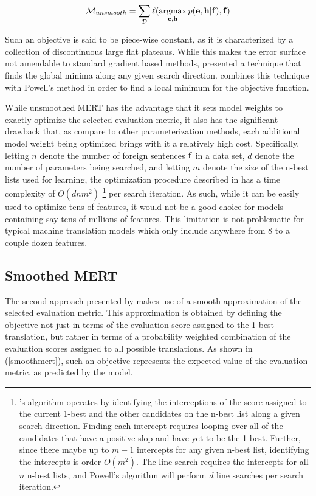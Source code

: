 \documentclass[11pt]{article}
\DeclareMathOperator*{\argmax}{argmax}
\begin{document}
\begin{equation}
{\cal M}_{unsmooth} = \sum_{{\cal D}} \ell(\argmax_{{\bf e}, {\bf h}} p({\bf e}, {\bf h} | {\bf f}), {\bf f})
\label{unsmoothmert}
\end{equation}

Such an objective is said to be piece-wise constant, as it is characterized by a collection of discontinuous large flat plateaus. While this makes the error surface not amendable to standard gradient based methods,  presented a technique that finds the global minima along any given search direction.  combines this technique with Powell's method \cite{press1992} in order to find a local minimum for the objective function. 

While unsmoothed MERT has the advantage that it sets model weights to exactly optimize the selected evaluation metric, it also has the significant drawback that, as compare to other parameterization methods, each additional model weight being optimized brings with it a relatively high cost. Specifically, letting $n$ denote the number of foreign sentences ${\bf f}$ in a data set, $d$ denote the number of parameters being searched, and letting $m$ denote the size of the n-best lists used for learning, the optimization procedure described in  has a time complexity of $O(dnm^2)$ \footnote{'s algorithm operates by identifying the interceptions of the score assigned to the current 1-best and the other candidates on the n-best list along a given search direction. Finding each intercept requires looping over all of the candidates that have a positive slop and have yet to be the 1-best. Further, since there maybe up to $m-1$ intercepts for any given n-best list, identifying the intercepts is order $O(m^2)$. The line search requires the intercepts for all $n$ n-best lists, and Powell's algorithm will perform $d$ line searches per search iteration.} per search iteration.  As such, while it can be easily used to optimize tens of features, it would not be a good choice for models containing say tens of millions of features. This limitation is not problematic for typical machine translation models which only include anywhere from 8 to a couple dozen features. 

\subsection{Smoothed MERT}

The second approach presented by  makes use of a smooth approximation of the selected evaluation metric. This approximation is obtained by defining the objective not just in terms of the evaluation score assigned to the 1-best translation, but rather in terms of a probability weighted combination of the evaluation scores assigned to all possible translations. As shown in (\ref{smoothmert}), such an objective represents the expected value of the evaluation metric, as predicted by the model. 
\end{document}
